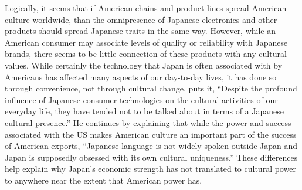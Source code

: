 \documentclass[12pt]{article}
\begin{document}
Logically, it seems that if American chains and product lines spread American culture worldwide, than the omnipresence of Japanese electronics and other products should spread Japanese traits in the same way.  However, while an American consumer may associate levels of quality or reliability with Japanese brands, there seems to be little connection of these products with any cultural values.  While certainly the technology that Japan is often associated with by Americans has affected many aspects of our day-to-day lives, it has done so through convenience, not through cultural change.  \cRecentering{\citet[pg.\ 26]} puts it, ``Despite the profound influence of Japanese consumer technologies on the cultural activities of our everyday life, they have tended not to be talked about in terms of a Japanese cultural presence.''  He continues by explaining that while the power and success associated with the US makes American culture an important part of the success of American exports, ``Japanese language is not widely spoken outside Japan and Japan is supposedly obsessed with its own cultural uniqueness.''
These differences help explain why Japan's economic strength has not translated to cultural power to anywhere near the extent that American power has.
\end{document}
